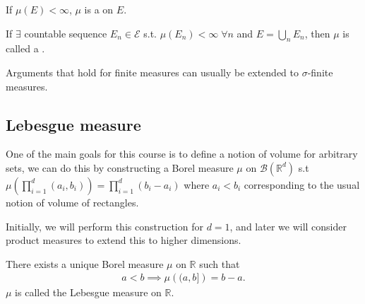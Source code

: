 \begin{definition}
	If $\mu(E) < \infty$, $\mu$ is a  on $E$.
\end{definition}

\begin{definition}
	If $\exists$ countable sequence $E_n \in \mathcal{E}$ s.t. $\mu(E_n) < \infty \; \forall n$ and $E = \bigcup_n E_n$, then $\mu$ is called a .
\end{definition}

\begin{remark}
	Arguments that hold for finite measures can usually be extended to $\sigma$-finite measures.
\end{remark}

\subsection{Lebesgue measure}
One of the main goals for this course is to define a notion of volume for arbitrary sets, we can do this by constructing a Borel measure $\mu$ on $\mathcal{B}(\mathbb{R}^d)$ s.t $\mu \left( \prod_{i=1}^d (a_i, b_i) \right) = \prod_{i=1}^d (b_i - a_i)$ where $a_i < b_i$ corresponding to the usual notion of volume of rectangles.

Initially, we will perform this construction for $d = 1$, and later we will consider product measures to extend this to higher dimensions.

\begin{theorem} \label{thm:leb}
	There exists a unique Borel measure $\mu$ on $\mathbb R$ such that
	\begin{align*}
		a < b \implies \mu \left( (a,b] \right) = b - a. \tag{$\dagger$}
	\end{align*}
	$\mu$ is called the Lebesgue measure on $\mathbb{R}$.
\end{theorem}

